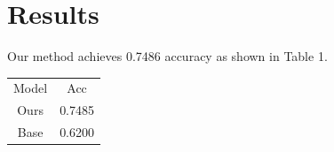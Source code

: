 ﻿\section{Results}
Our method achieves 0.7486 accuracy as shown in Table 1.
\begin{table}
\begin{tabular}{cc}
Model & Acc \\
Ours & 0.7485 \\
Base & 0.6200 \\
\end{tabular}
\end{table}
